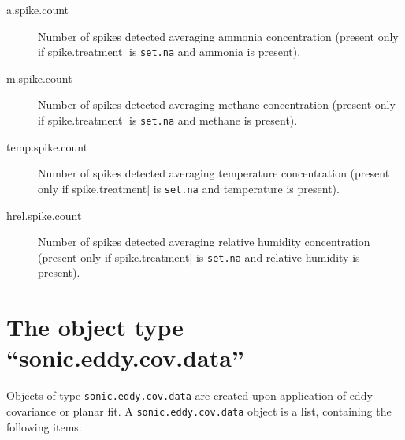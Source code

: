 \documentclass[a4paper,10pt]{book}
\begin{document}
\begin{description}
 \item[a.spike.count] Number of spikes detected averaging ammonia concentration (present only if \verb||spike.treatment| is \verb|set.na| and ammonia is present).
 \item[m.spike.count] Number of spikes detected averaging methane concentration (present only if \verb||spike.treatment| is \verb|set.na| and methane is present).
 \item[temp.spike.count] Number of spikes detected averaging temperature concentration (present only if \verb||spike.treatment| is \verb|set.na| and temperature is present).
 \item[hrel.spike.count] Number of spikes detected averaging relative humidity concentration (present only if \verb||spike.treatment| is \verb|set.na| and relative humidity is present).
\end{description}


\section{The object type ``sonic.eddy.cov.data''}
\label{sec:sonic.eddy.cov.data}

Objects of type \verb|sonic.eddy.cov.data| are created upon application of eddy covariance or planar fit. A \verb|sonic.eddy.cov.data| object is a list, containing the following items:
\end{document}
